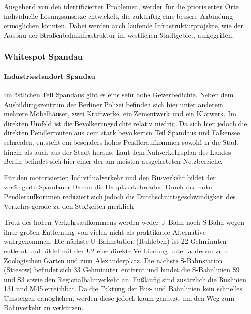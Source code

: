 Ausgehend von den identifizierten Problemen, werden für die priorisierten Orte individuelle Lösungsansätze entwickelt, die zukünftig eine bessere Anbindung ermöglichen könnten. Dabei werden auch laufende Infrastrukturprojekte, wie der Ausbau der Straßenbahninfrastruktur im westlichen Stadtgebiet, aufgegriffen.



\subsubsection{Whitespot Spandau}
\paragraph{Industriestandort Spandau}
Im östlichen Teil Spandaus gibt es eine sehr hohe Gewerbedichte. Neben dem Ausbildungszentrum der Berliner Polizei befinden sich hier unter anderem mehrere Möbelhäuser, zwei Kraftwerke, ein Zementwerk und ein Klärwerk. Im direkten Umfeld ist die Bevölkerungsdichte relativ niedrig. Da sich hier jedoch die direkten Pendlerrouten aus dem stark bevölkerten Teil Spandaus und Falkensee schneiden, entsteht ein besonders hohes Pendleraufkommen sowohl in die Stadt hinein als auch aus der Stadt heraus. Laut dem Nahverkehrsplan des Landes Berlin befindet sich hier einer der am meisten ausgelasteten Netzbereiche.

Für den motorisierten Individualverkehr und den Busverkehr bildet der verlängerte Spandauer Damm die Hauptverkehrsader. Durch das hohe Pendleraufkommen reduziert sich jedoch die Durchschnittsgeschwindigkeit des Verkehrs gerade zu den Stoßzeiten merklich.

Trotz des hohen Verkehrsaufkommens werden weder U-Bahn noch S-Bahn wegen ihrer großen Entfernung von vielen nicht als praktikable Alternative wahrgenommen. Die nächste U-Bahnstation (Ruhleben) ist 22 Gehminuten entfernt und bildet mit der U2 eine direkte Verbindung unter anderem zum Zoologischen Garten und zum Alexanderplatz. Die nächste S-Bahnstation (Stresow) befindet sich 33 Gehminuten entfernt und bindet die S-Bahnlinien S9 und S3 sowie den Regionalbahnverkehr an. Fußläufig sind zusätzlich die Buslinien 131 und M45 erreichbar. Da die Taktung der Bus- und Bahnlinien kein schnelles Umsteigen ermöglichen, werden diese jedoch kaum genutzt, um den Weg zum Bahnverkehr zu verkürzen.


